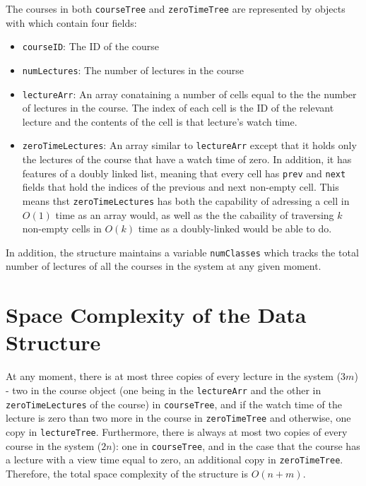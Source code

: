 \documentclass{article}
\newcommand{\code}[1]{\texttt{#1}}
\begin{document}
    The courses in both \code{courseTree} and \code{zeroTimeTree} are represented by objects with
    which contain four fields:
    \begin{itemize}
        \item \texttt{courseID}: The ID of the course
        \item \texttt{numLectures}: The number of lectures in the course
        \item \texttt{lectureArr}: An array conataining a number  of cells equal to the 
                the number of lectures in the course. The index of each cell is the ID of the 
                relevant lecture and the contents of the cell is that lecture's watch time.
        \item \texttt{zeroTimeLectures}: An array similar to \texttt{lectureArr} except that it holds
                only the lectures of the course that have a watch time of zero. In addition, it has features
                of a doubly linked list, meaning that every cell has \texttt{prev} and \texttt{next} fields
                that hold the indices of the previous and next non-empty cell. This means thst \texttt{zeroTimeLectures}
                has both the capability of adressing a cell in $O(1)$ time as an array would, as well as the
                the cabaility of traversing $k$ non-empty cells in $O(k)$ time as a doubly-linked would
                be able to do.
    \end{itemize}
    In addition, the structure maintains a variable \texttt{numClasses} which tracks the total number of 
    lectures of all the courses in the system at any given moment.
\section*{Space Complexity of the Data Structure}
    At any moment, there is at most three copies of every lecture in the system ($3m$) - two in 
    the course object (one being in the \texttt{lectureArr} and the other in \texttt{zeroTimeLectures} of the course)
    in \texttt{courseTree}, and if the watch time of the lecture is zero than two more in the course in
    \texttt{zeroTimeTree} and otherwise, one copy in \texttt{lectureTree}.
    Furthermore, there is always at most two copies of every course in the system ($2n$): one in 
    \texttt{courseTree}, and in the case that the course has a lecture with a view time equal to zero, 
    an additional copy in \texttt{zeroTimeTree}.
    Therefore, the total space complexity of the structure is $O(n+m)$.
\end{document}
